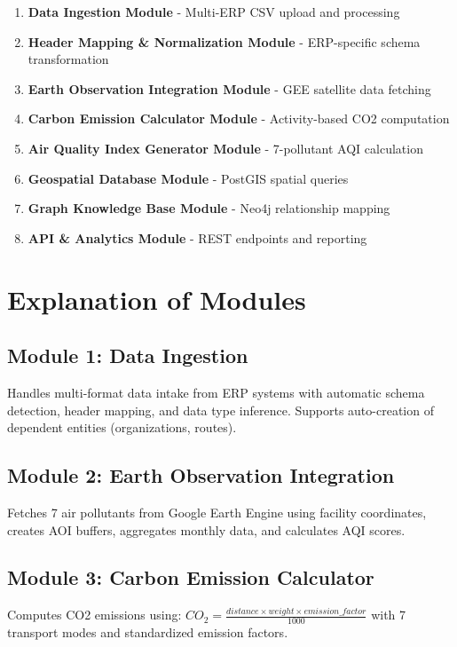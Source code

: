 \documentclass[11pt,a4paper]{article}
\begin{document}
\begin{enumerate}
    \item \textbf{Data Ingestion Module} - Multi-ERP CSV upload and processing
    \item \textbf{Header Mapping \& Normalization Module} - ERP-specific schema transformation
    \item \textbf{Earth Observation Integration Module} - GEE satellite data fetching
    \item \textbf{Carbon Emission Calculator Module} - Activity-based CO2 computation
    \item \textbf{Air Quality Index Generator Module} - 7-pollutant AQI calculation
    \item \textbf{Geospatial Database Module} - PostGIS spatial queries
    \item \textbf{Graph Knowledge Base Module} - Neo4j relationship mapping
    \item \textbf{API \& Analytics Module} - REST endpoints and reporting
\end{enumerate}

\section{Explanation of Modules}

\subsection{Module 1: Data Ingestion}
Handles multi-format data intake from ERP systems with automatic schema detection, header mapping, and data type inference. Supports auto-creation of dependent entities (organizations, routes).

\subsection{Module 2: Earth Observation Integration}
Fetches 7 air pollutants from Google Earth Engine using facility coordinates, creates AOI buffers, aggregates monthly data, and calculates AQI scores.

\subsection{Module 3: Carbon Emission Calculator}
Computes CO2 emissions using: $CO_2 = \frac{distance \times weight \times emission\_factor}{1000}$ with 7 transport modes and standardized emission factors.
\end{document}
